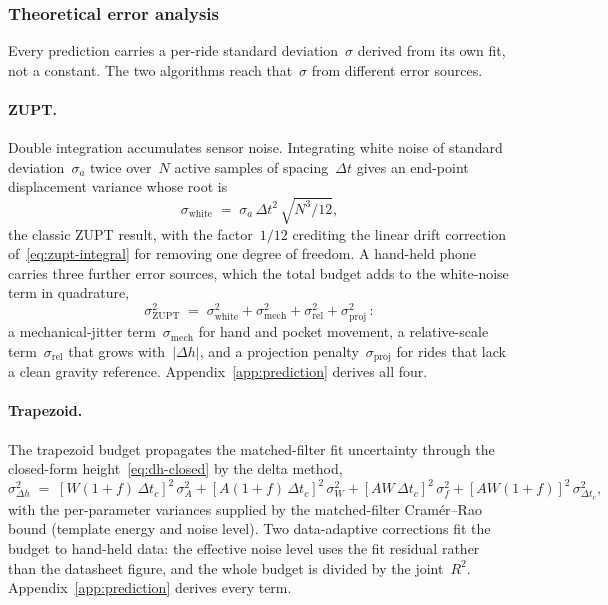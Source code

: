 \documentclass[manuscript,review,screen]{acmart}
\begin{document}
\subsubsection{Theoretical error analysis}
\label{sec:algo-error}

Every prediction carries a per-ride standard deviation~$\sigma$
derived from its own fit, not a constant.  The two algorithms reach
that~$\sigma$ from different error sources.

\paragraph{ZUPT.}
Double integration accumulates sensor noise.  Integrating white noise
of standard deviation~$\sigma_a$ twice over~$N$ active samples of
spacing~$\Delta t$ gives an end-point displacement variance whose
root is
\begin{equation}
  \sigma_{\mathrm{white}}
   \;=\; \sigma_a\,\Delta t^{2}\,\sqrt{N^{3}/12},
  \label{eq:sigma-zupt}
\end{equation}
the classic ZUPT result, with the factor~$1/12$ crediting the linear
drift correction of~\eqref{eq:zupt-integral} for removing one degree
of freedom.  A hand-held phone carries three further error sources,
which the total budget adds to the white-noise term in quadrature,
\begin{equation}
  \sigma_{\mathrm{ZUPT}}^{2}
   \;=\;\sigma_{\mathrm{white}}^{2}
        +\sigma_{\mathrm{mech}}^{2}
        +\sigma_{\mathrm{rel}}^{2}
        +\sigma_{\mathrm{proj}}^{2}\,:
  \label{eq:sigma-zupt-total}
\end{equation}
a mechanical-jitter term~$\sigma_{\mathrm{mech}}$ for hand and pocket
movement, a relative-scale term~$\sigma_{\mathrm{rel}}$ that grows
with~$|\Delta h|$, and a projection penalty~$\sigma_{\mathrm{proj}}$
for rides that lack a clean gravity reference.
Appendix~\ref{app:prediction} derives all four.

\paragraph{Trapezoid.}
The trapezoid budget propagates the matched-filter fit uncertainty
through the closed-form height~\eqref{eq:dh-closed} by the delta
method,
\begin{equation}
  \sigma_{\Delta h}^{2}
  \;=\;[W(1{+}f)\,\Delta t_c]^{2}\,\sigma_A^{2}
       +[A(1{+}f)\,\Delta t_c]^{2}\,\sigma_W^{2}
       +[AW\,\Delta t_c]^{2}\,\sigma_f^{2}
       +[AW(1{+}f)]^{2}\,\sigma_{\Delta t_c}^{2},
  \label{eq:sigma-dh}
\end{equation}
with the per-parameter variances supplied by the matched-filter
Cram\'er--Rao bound (template energy and noise level).  Two
data-adaptive corrections fit the budget to hand-held data: the
effective noise level uses the fit residual rather than the datasheet
figure, and the whole budget is divided by the joint~$R^{2}$.
Appendix~\ref{app:prediction} derives every term.
\end{document}
